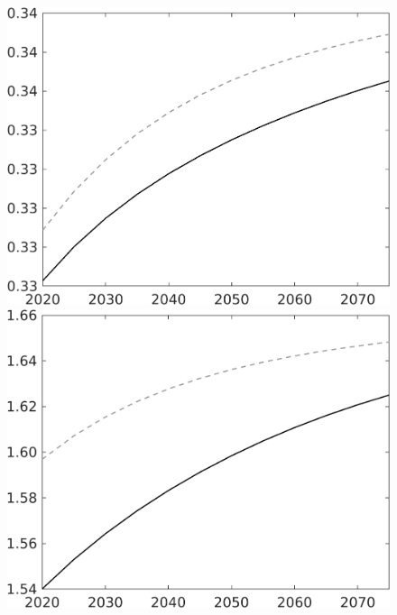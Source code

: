 \documentclass[12pt]{article}
\begin{document}
\begin{figure}
\begin{minipage}[]{0.32\textwidth}
	\end{minipage}		
\begin{minipage}[]{0.32\textwidth}
\includegraphics[width=1\textwidth]{../../codding_model/own_basedOnFried/optimalPol_010922_revision/figures/all_13Sept22/LevTaufNoTauf_TaulCalib_Equlab_regime0_Ln_spillover0_nsk1_xgr0_knspil1_sep1_LFlimit0_emsbase0_countec0_GovRev0_etaa0.79_lgd0.png}
\end{minipage}		
	\begin{minipage}[]{0.32\textwidth}
		\includegraphics[width=1\textwidth]{../../codding_model/own_basedOnFried/optimalPol_010922_revision/figures/all_13Sept22/LevTaufNoTauf_TaulCalib_Equlab_regime0_pn_spillover0_nsk1_xgr0_knspil1_sep1_LFlimit0_emsbase0_countec0_GovRev0_etaa0.79_lgd0.png}

\end{minipage}
\end{figure}
\end{document}
